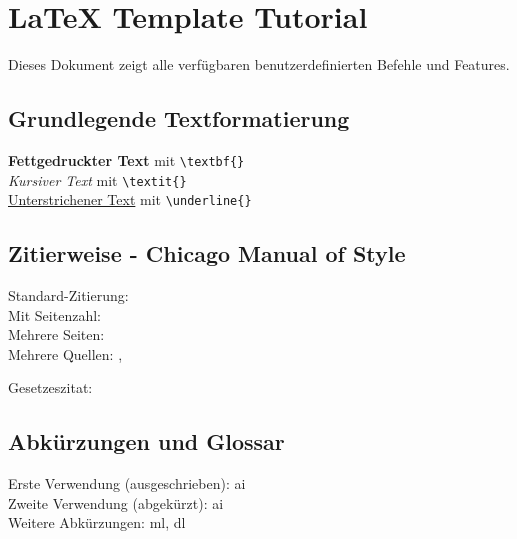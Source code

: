 \documentclass[../main.tex]{subfiles}
\begin{document}

\section{LaTeX Template Tutorial}

Dieses Dokument zeigt alle verfügbaren benutzerdefinierten Befehle und Features.


\subsection{Grundlegende Textformatierung}

\textbf{Fettgedruckter Text} mit \verb|\textbf{}|\\
\textit{Kursiver Text} mit \verb|\textit{}|\\
\underline{Unterstrichener Text} mit \verb|\underline{}|


\subsection{Zitierweise - Chicago Manual of Style}

Standard-Zitierung: \autocite{smith2018}\\
Mit Seitenzahl: \autocite[42]{smith2018}\\
Mehrere Seiten: \autocite[15-27]{johnson2020}\\
Mehrere Quellen: \autocite{smith2018}, \autocite{johnson2020}

Gesetzeszitat: 


\subsection{Abkürzungen und Glossar}

Erste Verwendung (ausgeschrieben): \gls{ai}\\
Zweite Verwendung (abgekürzt): \gls{ai}\\
Weitere Abkürzungen: \gls{ml}, \gls{dl}
\end{document}
